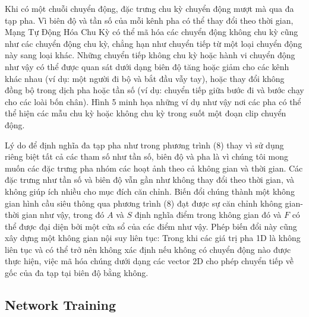 Khi có một chuỗi chuyển động, đặc trưng chu kỳ chuyển động mượt mà qua đa tạp pha. Vì biên độ và tần số của mỗi kênh pha có thể thay đổi theo thời gian, Mạng Tự Động Hóa Chu Kỳ có thể mã hóa các chuyển động không chu kỳ cũng như các chuyển động chu kỳ, chẳng hạn như chuyển tiếp từ một loại chuyển động này sang loại khác. Những chuyển tiếp không chu kỳ hoặc hành vi chuyển động như vậy có thể được quan sát dưới dạng biên độ tăng hoặc giảm cho các kênh khác nhau (ví dụ: một người đi bộ và bắt đầu vẫy tay), hoặc thay đổi không đồng bộ trong dịch pha hoặc tần số (ví dụ: chuyển tiếp giữa bước đi và bước chạy cho các loài bốn chân). Hình 5 minh họa những ví dụ như vậy nơi các pha có thể thể hiện các mẫu chu kỳ hoặc không chu kỳ trong suốt một đoạn clip chuyển động.



Lý do để định nghĩa đa tạp pha như trong phương trình (8) thay vì sử dụng riêng biệt tất cả các tham số như tần số, biên độ và pha là vì chúng tôi mong muốn các đặc trưng pha nhóm các hoạt ảnh theo cả không gian và thời gian. Các đặc trưng như tần số và biên độ vẫn gần như không thay đổi theo thời gian, và không giúp ích nhiều cho mục đích căn chỉnh. Biến đổi chúng thành một không gian hình cầu siêu thông qua phương trình (8) đạt được sự căn chỉnh không gian-thời gian như vậy, trong đó $A$ và $S$ định nghĩa điểm trong không gian đó và $F$ có thể được đại diện bởi một cửa sổ của các điểm như vậy. Phép biến đổi này cũng xây dựng một không gian nội suy liên tục: Trong khi các giá trị pha 1D là không liên tục và có thể trở nên không xác định nếu không có chuyển động nào được thực hiện, việc mã hóa chúng dưới dạng các vector 2D cho phép chuyển tiếp về gốc của đa tạp tại biên độ bằng không.

\subsection{Network Training}

